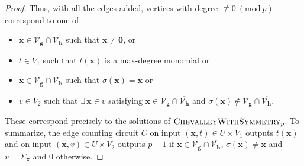 \documentclass[10pt,a4paper]{article}
\theoremstyle{definition}
\theoremstyle{remark}
\newcommand{\inparen}[1]{\left ( #1 \right )}
\renewcommand{\mod}[1]{~\inparen{\mathrm{mod}~#1}}
\newcommand{\calV}{\mathcal{V}}
\renewcommand{\vec}[1]{\boldsymbol{#1}}
\newcommand{\vecg}{\ensuremath{\boldsymbol{g}}}
\newcommand{\vech}{\ensuremath{\boldsymbol{h}}}
\newcommand{\vecx}{\ensuremath{\boldsymbol{x}}}
\newcommand{\pnum}{p}
\newcommand{\cChevalleyp}{\textsc{ChevalleyWithSymmetry}_{\pnum}}
\begin{document}
\begin{proof}
 Thus, with all the edges added, vertices with degree $\not\equiv 0 \mod{p}$ correspond to one of\vspace{-2mm}
 \begin{itemize}
 \item $\vecx \in \calV_{\vecg} \cap \calV_{\vech}$ such that $\vecx \ne \vec{0}$, or
 \item $t \in V_1$ such that $t(\vecx)$ is a max-degree monomial or
 \item $\vecx \in \calV_{\vecg} \cap \overline{\calV_{\vech}}$ such that $\sigma(\vecx) = \vecx$ or
 \item $v \in V_2$ such that $\exists\, \vecx \in v$ satisfying $\vecx \in \calV_{\vecg} \cap \overline{\calV_{\vech}}$ and $\sigma(\vecx) \notin \calV_{\vecg} \cap \overline{\calV_{\vech}}$.
 \end{itemize}
 These correspond precisely to the solutions of $\cChevalleyp$. To summarize, the edge
 counting circuit $C$ on input $(\vecx, t) \in U \times V_1$ outputs
 $t(\vecx)$ and on input $(\vecx, v) \in U \times V_2$ outputs $p-1$ if
 $\vecx \in \calV_{\vecg} \cap \overline{\calV_{\vech}}$, $\sigma(\vecx) \ne \vecx$ and $v = \Sigma_{\vecx}$ and 0
 otherwise.



\end{proof}
\end{document}
